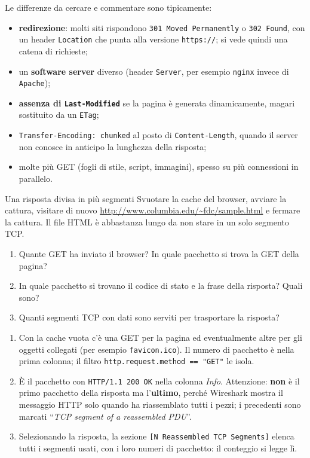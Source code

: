 \svolgimento
Le differenze da cercare e commentare sono tipicamente:
\begin{itemize}
    \item \textbf{redirezione}: molti siti rispondono \texttt{301 Moved Permanently} o \texttt{302 Found}, con un header
          \texttt{Location} che punta alla versione \texttt{https://}; si vede quindi una catena di richieste;
    \item un \textbf{software server} diverso (header \texttt{Server}, per esempio \texttt{nginx} invece di \texttt{Apache});
    \item \textbf{assenza di \texttt{Last-Modified}} se la pagina è generata dinamicamente, magari sostituito da un
          \texttt{ETag};
    \item \texttt{Transfer-Encoding: chunked} al posto di \texttt{Content-Length}, quando il server non conosce in anticipo la
          lunghezza della risposta;
    \item molte più GET (fogli di stile, script, immagini), spesso su più connessioni in parallelo.
\end{itemize}

\begin{esercizio}{Una risposta divisa in più segmenti}
Svuotare la cache del browser, avviare la cattura, visitare di nuovo \url{http://www.columbia.edu/~fdc/sample.html} e fermare la
cattura. Il file HTML è abbastanza lungo da non stare in un solo segmento TCP.
\begin{enumerate}[label=(\alph*)]
    \item Quante GET ha inviato il browser? In quale pacchetto si trova la GET della pagina?
    \item In quale pacchetto si trovano il codice di stato e la frase della risposta? Quali sono?
    \item Quanti segmenti TCP con dati sono serviti per trasportare la risposta?
\end{enumerate}
\end{esercizio}

\svolgimento
\begin{enumerate}[label=(\alph*)]
    \item Con la cache vuota c'è una GET per la pagina ed eventualmente altre per gli oggetti collegati (per esempio
          \texttt{favicon.ico}). Il numero di pacchetto è nella prima colonna; il filtro \texttt{http.request.method == "GET"}
          le isola.
    \item È il pacchetto con \texttt{HTTP/1.1 200 OK} nella colonna \emph{Info}. Attenzione: \textbf{non} è il primo pacchetto
          della risposta ma l'\textbf{ultimo}, perché Wireshark mostra il messaggio HTTP solo quando ha riassemblato tutti i
          pezzi; i precedenti sono marcati ``\emph{TCP segment of a reassembled PDU}''.
    \item Selezionando la risposta, la sezione \texttt{[N Reassembled TCP Segments]} elenca tutti i segmenti usati, con i loro
          numeri di pacchetto: il conteggio si legge lì.
\end{enumerate}

